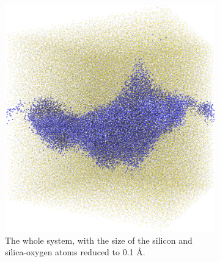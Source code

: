 \begin{figure}[!p]
\begin{subfigure}[t]{\myfigwidth}
    \end{subfigure}%
    \hfill%
        \begin{subfigure}[t]{\myfigwidth}%
        \centering%
        \includegraphics[width=\textwidth]{images/systems/trimmed-rough_fracture01_abel_15}%
        \caption{The whole system, with the size of the silicon and silica-oxygen atoms reduced to 0.1 \AA.}%
    \end{subfigure}%
    \vspace{10pt}\\%
    \begin{subfigure}[t]{\myfigwidth}%
        \centering%

\end{subfigure}
\end{figure}
